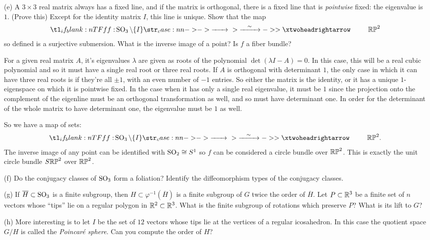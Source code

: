 \documentclass{../../templates/lkx_pset}
\begin{document}
\begin{parts}
	\begin{part}{(e)}
		A $3\times 3$ real matrix always has a fixed line, and if the matrix is orthogonal, there is a fixed line that is \emph{pointwise} fixed: the eigenvalue is $1$. (Prove this) Except for the identity matrix $I$, this line is unique. Show that the map \[\lkxfunc{f}{\SO_3 \setminus \{I\}}{\RP^2}\] so defined is a surjective submersion. What is the inverse image of a point? Is $f$ a fiber bundle?
	\end{part}

	For a given real matrix $A$, it's eigenvalues $\lambda$ are given as roots of the polynomial $\det(\lambda I-A)=0$. In this case, this will be a real cubic polynomial and so it must have a single real root or three real roots. If $A$ is orthogonal with determinant $1$, the only case in which it can have three real roots is if they're all $\pm 1$, with an even number of $-1$ entries. So either the matrix is the identity, or it has a unique $1$-eigenspace on which it is pointwise fixed. In the case when it has only a single real eigenvalue, it must be $1$ since the projection onto the complement of the eigenline must be an orthogonal transformation as well, and so must have determinant one. In order for the determinant of the whole matrix to have determinant one, the eigenvalue must be $1$ as well.

	So we have a map of sets: \[\lkxfunc{f}{\SO_3\setminus\{I\}}{\RP^2.}\]
	The inverse image of any point can be identified with $\operatorname{SO}_2\cong S^1$ so $f$ can be considered a circle bundle over $\mathbb{RP}^2$. This is exactly the unit circle bundle $S\mathbb{RP}^2$ over $\mathbb{RP}^2$.

	\begin{part}{(f)}
		Do the conjugacy classes of $\operatorname{SO}_3$ form a foliation? Identify the diffeomorphism types of the conjugacy classes.
	\end{part}

	\begin{part}{(g)}
		If $\overline{H} \subset \operatorname{SO}_3$ is a finite subgroup, then $H\subset \varphi^{-1}(\overline{H})$ is a finite subgroup of $G$ twice the order of $\overline{H}$. Let $P\subset \mathbb{R}^3$ be a finite set of $n$ vectors whose ``tips'' lie on a regular polygon in $\mathbb{R}^2\subset \mathbb{R}^3$. What is the finite subgroup of rotations which preserve $P$? What is its lift to $G$?
	\end{part}

	\begin{part}{(h)}
		More interesting is to let $I$ be the set of $12$ vectors whose tips lie at the vertices of a regular icosahedron. In this case the quotient space $G/H$ is called the \emph{Poincar\'e sphere}. Can you compute the order of $H$?
	\end{part}
\end{parts}
\end{document}
